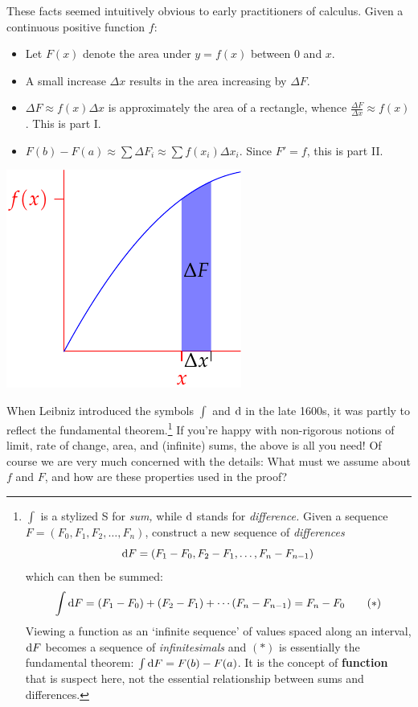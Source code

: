 \begin{minipage}[t]{0.7\linewidth}\vspace{-10pt}
	These facts seemed intuitively obvious to early practitioners of calculus. Given a continuous positive function $f$:
	\begin{itemize}
	  \item Let $F(x)$ denote the area under $y=f(x)$ between $0$ and $x$. 
	  \item A small increase $\Delta x$ results in the area increasing by $\Delta F$.
	  \item $\Delta F\approx f(x)\Delta x$ is approximately the area of a rectangle, whence $\frac{\Delta F}{\Delta x}\approx f(x)$. This is part I.
	  \item $F(b)-F(a)\approx\sum \Delta F_i\approx \sum f(x_i)\Delta x_i$. Since $F'=f$, this is part II.
	\end{itemize}
\end{minipage}
\hfill
\begin{minipage}[t]{0.29\linewidth}\vspace{-10pt}
	\flushright\includegraphics[scale=0.95]{ftcold}
\end{minipage}\medbreak

When Leibniz introduced the symbols $\int$ and $\mathrm{d}$ in the late 1600s, it was partly to reflect the fundamental theorem.\footnote{%
	\def\dF{\D F}$\int$ is a stylized S for \emph{sum,} while $\mathrm{d}$ stands for \emph{difference.} Given a sequence $F=(F_0,F_1,F_2,\ldots,F_n)$, construct a new sequence of \emph{differences}
	\[
		\dF=(F_1-F_0,F_2-F_1,\ldots,F_n-F_{n-1})
	\]
	which can then be summed:
	\[
		\int\dF=(F_1-F_0)+(F_2-F_1)+\cdots (F_n-F_{n-1})=F_n-F_0 \tag{$\ast$}
	\]
	Viewing a function as an `infinite sequence' of values spaced along an interval, $\dF$ becomes a sequence of \emph{infinitesimals} and $(\ast)$ is essentially the fundamental theorem: $\int\dF =F(b)-F(a)$. It is the concept of \textbf{function} that is suspect here, not the essential relationship between sums and differences.%
}
If you're happy with non-rigorous notions of limit, rate of change, area, and (infinite) sums, the above is all you need!\smallbreak
Of course we are very much concerned with the details: What must we assume about $f$ and $F$, and how are these properties used in the proof?


